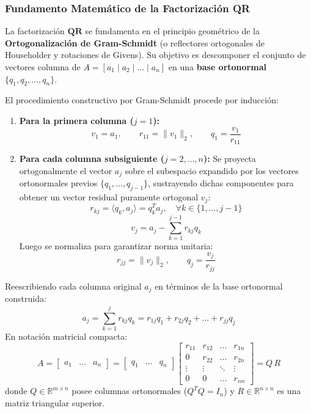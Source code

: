 \documentclass[11pt,a4paper]{article}
\theoremstyle{definition}
\theoremstyle{remark}
\begin{document}
\subsubsection{Fundamento Matemático de la Factorización QR}
La factorización $\mathbf{QR}$ se fundamenta en el principio geométrico de la \textbf{Ortogonalización de Gram-Schmidt} (o reflectores ortogonales de Householder y rotaciones de Givens). Su objetivo es descomponer el conjunto de vectores columna de $A = [a_1 \mid a_2 \mid \dots \mid a_n]$ en una \textbf{base ortonormal} $\{q_1, q_2, \dots, q_n\}$.

El procedimiento constructivo por Gram-Schmidt procede por inducción:
\begin{enumerate}[leftmargin=*]
    \item \textbf{Para la primera columna ($j = 1$):}
    \begin{equation}
        v_1 = a_1, \qquad r_{11} = \|v_1\|_2, \qquad q_1 = \frac{v_1}{r_{11}}
    \end{equation}
    \item \textbf{Para cada columna subsiguiente ($j = 2, \dots, n$):}
    Se proyecta ortogonalmente el vector $a_j$ sobre el subespacio expandido por los vectores ortonormales previos $\{q_1, \dots, q_{j-1}\}$, sustrayendo dichas componentes para obtener un vector residual puramente ortogonal $v_j$:
    \begin{equation}
        r_{kj} = \langle q_k, a_j \rangle = q_k^T a_j, \quad \forall k \in \{1, \dots, j-1\}
    \end{equation}
    \begin{equation}
        v_j = a_j - \sum_{k=1}^{j-1} r_{kj} q_k
    \end{equation}
    Luego se normaliza para garantizar norma unitaria:
    \begin{equation}
        r_{jj} = \|v_j\|_2, \qquad q_j = \frac{v_j}{r_{jj}}
    \end{equation}
\end{enumerate}
Reescribiendo cada columna original $a_j$ en términos de la base ortonormal construida:
\begin{equation}
    a_j = \sum_{k=1}^{j} r_{kj} q_k = r_{1j}q_1 + r_{2j}q_2 + \dots + r_{jj}q_j
\end{equation}
En notación matricial compacta:
\begin{equation}
    A = \begin{bmatrix} a_1 & \dots & a_n \end{bmatrix} = \begin{bmatrix} q_1 & \dots & q_n \end{bmatrix} \begin{bmatrix} 
    r_{11} & r_{12} & \dots & r_{1n} \\
    0 & r_{22} & \dots & r_{2n} \\
    \vdots & \vdots & \ddots & \vdots \\
    0 & 0 & \dots & r_{nn}
    \end{bmatrix} = Q \, R
\end{equation}
donde $Q \in \mathbb{R}^{m \times n}$ posee columnas ortonormales ($Q^T Q = I_n$) y $R \in \mathbb{R}^{n \times n}$ es una matriz triangular superior.
\end{document}
